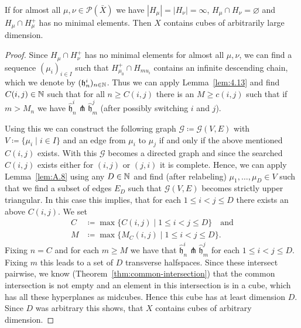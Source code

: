 \begin{prop}[{\cite[Proposition~4.10]{MR3509968}}]
  \label{prop:4.10}
  If for almost all \(\mu, \nu \in \mathcal{P}(\bar X)\) we have \(|H_\mu| = |H_\nu| = \infty\), \(H_\mu \cap H_\nu = \varnothing\) and \(H_\mu \cap H_\mu^+\) has no minimal elements. Then \(X\) contains cubes of arbitrarily large dimension.
\end{prop}

\begin{proof}
  Since \(H_\mu \cap H_\nu^+\) has no minimal elements for almost all \(\mu, \nu\), we can find a sequence \((\mu_i)_{i \in I}\) such that \(H_{\mu_0}^+ \cap H_{mu_i}\) contains an infinite descending chain, which we denote by \((\mathfrak{h}^i_n)_{n \in \mathbb{N}}\). Thus we can apply Lemma~\ref{lem:4.13} and find \(C(i,j) \in \mathbb{N}\) such that for all \(n \geq C(i,j)\) there is an \(M \geq c(i,j)\) such that if \(m > M_n\) we have \(\mathfrak{\hat h}_n^i \pitchfork \mathfrak{\hat h}_m^j\) (after possibly switching \(i\) and \(j\)).

  Using this we can construct the following graph \(\mathcal{G} \coloneqq \mathcal{G}(V,E)\) with \(V \coloneqq \{\mu_i \mid i \in I\}\) and an edge from \(\mu_i\) to \(\mu_j\) if and only if the above mentioned \(C(i,j)\) exists. With this \(\mathcal{G}\) becomes a directed graph and since the searched \(C(i,j)\) exists either for \((i,j)\) or \((j,i)\) it is complete. Hence, we can apply Lemma~\ref{lem:A.8} using any \(D \in \mathbb{N}\) and find (after relabeling) \(\mu_1, \dots, \mu_D \in V\) such that we find a subset of edges \(E_D\) such that \(\mathcal{G}(V,E)\) becomes strictly upper triangular. In this case this implies, that for each \(1\leq i < j \leq D\) there exists an above \(C(i,j)\). We set
  \begin{align*}
    C &\coloneqq \max\{C(i,j) \mid 1 \leq i < j \leq D\} \quad \text{and}\\
    M &\coloneqq \max\{M_C(i,j) \mid 1 \leq i < j \leq D\}.
  \end{align*}
  Fixing \(n = C\) and for each \(m \geq M\) we have that \(\mathfrak{\hat h}_n^i \pitchfork \mathfrak{\hat h}_m^j\) for each \(1 \leq i < j \leq D\). Fixing \(m\) this leads to a set of \(D\) transverse halfspaces. Since these intersect pairwise, we know (Theorem~\ref{thm:common-intersection}) that the common intersection is not empty and an element in this intersection is in a cube, which has all these hyperplanes as midcubes. Hence this cube has at least dimension \(D\). Since \(D\) was arbitrary this shows, that \(X\) contains cubes of arbitrary dimension.
\end{proof}

